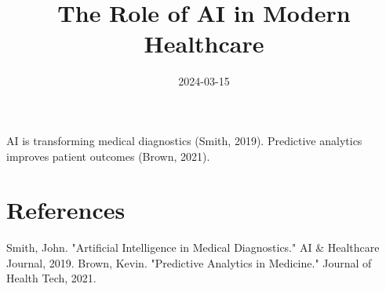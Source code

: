 \documentclass{article}
\title{The Role of AI in Modern Healthcare}
\date{2024-03-15}
\begin{document}
\maketitle
AI is transforming medical diagnostics (Smith, 2019). Predictive analytics improves patient outcomes (Brown, 2021).
\section{References}
Smith, John. "Artificial Intelligence in Medical Diagnostics." AI \& Healthcare Journal, 2019.
Brown, Kevin. "Predictive Analytics in Medicine." Journal of Health Tech, 2021.
\end{document}

